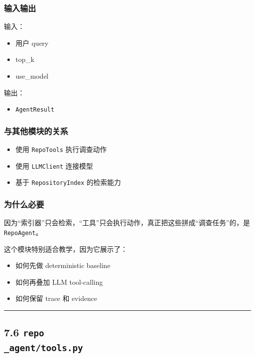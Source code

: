 \documentclass[UTF8,12pt,openany]{ctexbook}
\begin{document}
\subsubsection{输入输出}

输入：\par

\begin{itemize}
\item 用户 query
\item top\_k
\item use\_model
\end{itemize}

输出：\par

\begin{itemize}
\item \texttt{AgentResult}
\end{itemize}

\subsubsection{与其他模块的关系}

\begin{itemize}
\item 使用 \texttt{RepoTools} 执行调查动作
\item 使用 \texttt{LLMClient} 连接模型
\item 基于 \texttt{RepositoryIndex} 的检索能力
\end{itemize}

\subsubsection{为什么必要}

因为“索引器”只会检索，“工具”只会执行动作，真正把这些拼成“调查任务”的，是 \texttt{RepoAgent}。\par

这个模块特别适合教学，因为它展示了：\par

\begin{itemize}
\item 如何先做 deterministic baseline
\item 如何再叠加 LLM tool-calling
\item 如何保留 trace 和 evidence
\end{itemize}

\hrule

\subsection{7.6 \texttt{repo\\_agent/tools.py}}
\end{document}
